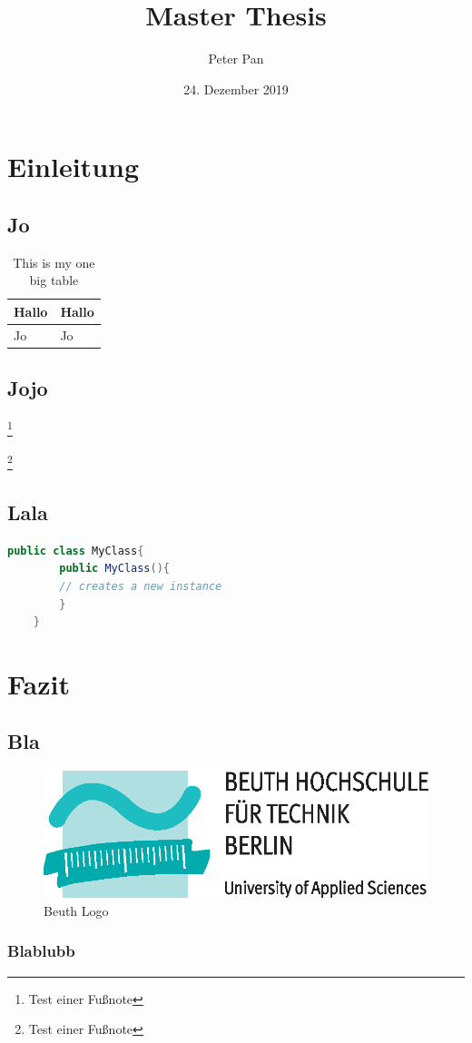 \documentclass{bht-thesis}
\title{Master Thesis}
\author{Peter Pan}
\date{24. Dezember 2019}
\begin{document}
\cleardoublepage
{}
\maketitle
\tableofcontents
\listoffigures
\listoftables
\lstlistoflistings
\cleardoublepage

\onehalfspacing
{}

\chapter{Einleitung}
\section{Jo}
\blindtext[4]

\blindtext[2]
\begin{table}
	\centering
	\begin{tabular}{|l|l|}
		\hline
		Hallo & Hallo \\
		\hline
		Jo & Jo \\
		\hline
	\end{tabular}
	\caption{This is my one big table} \label{tab:sometab}
	\end{table}
\blindtext[3]
\section{Jojo}
\blindtext[2]

\blindtext[3]\footnote{Test einer Fußnote}

\blindtext[5]

\blindtext[1]\footnote{Test einer Fußnote}

\section{Lala}
\blindtext[3]
\begin{lstlisting}[language=Java,float,caption={Nice Java class},label={lst:class}]
	public class MyClass{
		public MyClass(){
		// creates a new instance
		}
	}
\end{lstlisting}
\blindtext[4]
\blindtext[2]
\chapter{Fazit}
\section{Bla}
\blindtext[1]
\begin{figure}
	\includegraphics{figures/Beuth-Logo_basis}
	\centering
	\caption{Beuth Logo}
	\label{fig:bht-logo}
\end{figure}
\blindtext[3]
\blindtext[5]
\subsection{Blablubb}
\blindtext[4]
\blindtext[2]
\blindtext[3]
\end{document}
